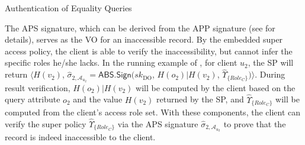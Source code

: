 \begin{algorithm}[t]
  \caption{Authentication of Equality Queries}\label{alg:access-control:equality-query}
\end{algorithm}

The APS signature, which can be derived from the APP signature (see  for details), serves as the VO for an inaccessible record. %
By the embedded super access policy, the client is able to verify the inaccessibility, but cannot infer the specific roles he/she lacks.
In the running example of , for client $u_2$, the SP will return $\langle H(v_2)$, $\hat{\sigma}_{2, \mathcal{A}_{u_2}} = \textsf{ABS.Sign}({sk}_\text{DO}$, $H(o_2) | H(v_2)$, $\hat{\Upsilon}_{\{{Role}_C \}})\rangle$. During result verification, $H(o_2) | H(v_2)$ will be computed by the client based on the query attribute $o_2$ and the value $H(v_2)$ returned by the SP, and $\hat{\Upsilon}_{\{{Role}_C \}}$ will be computed from the client's access role set. With these components, the client can verify the super policy $\hat{\Upsilon}_{\{{Role}_C \}}$ via the APS signature $\hat{\sigma}_{2, \mathcal{A}_{u_2}}$ to prove that the record is indeed inaccessible to the client. %

